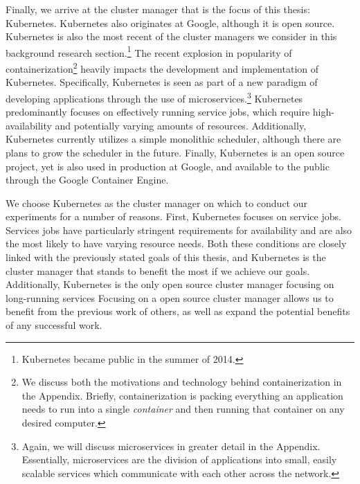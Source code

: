 Finally, we arrive at the cluster manager that is the focus of this thesis:
Kubernetes. Kubernetes also originates at Google, although it is open source.
Kubernetes is also the most
recent of the cluster managers we consider in this background research
section.\footnote{Kubernetes became public in the summer of 2014.} The recent
explosion in popularity of containerization\footnote{We discuss both the motivations and
technology behind containerization in the Appendix. Briefly, containerization is
packing everything an application needs to run into a single \textit{container}
and then running that container on any desired computer.}
heavily impacts the development and implementation of Kubernetes. Specifically,
Kubernetes is seen as part of a new paradigm of developing applications
through the use of microservices.\footnote{Again, we will
discuss microservices in greater detail
in the Appendix. Essentially, microservices are the division of applications
into small, easily scalable services which communicate with each other across
the network.} Kubernetes predominantly focuses on effectively running service
jobs, which require high-availability and potentially varying amounts of resources.
Additionally, Kubernetes currently utilizes a simple
monolithic scheduler, although
there are plans to grow the scheduler in the future.\cite{k8s-design-overview}
Finally, Kubernetes is an open source project, yet is also used in production at
Google, and available to the public through the Google Container
Engine.\cite{google-container-engine}

We choose Kubernetes as the cluster manager on which to conduct our experiments
for a number of reasons. First, Kubernetes focuses on service jobs. Services jobs
have particularly stringent requirements for availability and are also the most
likely to have varying resource needs. Both these conditions are closely linked
with the previously stated goals of this thesis, and Kubernetes is the cluster
manager that stands to benefit the most if we achieve our goals. Additionally,
Kubernetes is the only open source cluster manager focusing on long-running services
Focusing on a open source cluster manager allows us to benefit from
the previous work of others, as well as expand the potential benefits of any
successful work.

